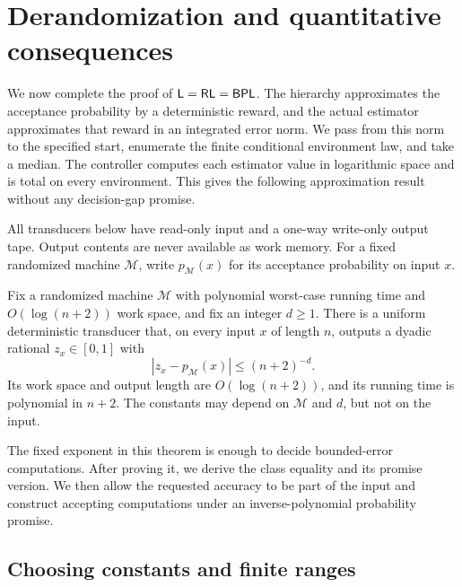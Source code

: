 \section{Derandomization and quantitative consequences}
\label{sec:conclusion}

We now complete the proof of $\mathsf L=\mathsf{RL}=\mathsf{BPL}$. The hierarchy
approximates the acceptance probability by a deterministic reward,
and the actual estimator approximates that reward in an integrated
error norm. We pass from this norm to the specified start, enumerate
the finite conditional environment law, and take a median. The
controller computes each estimator value in logarithmic space and is
total on every environment. This gives the following approximation
result without any decision-gap promise.

All transducers below have read-only input and a one-way write-only
output tape. Output contents are never available as work memory.
For a fixed randomized machine $\mathcal M$, write
$p_{\mathcal M}(x)$ for its acceptance probability on input $x$.

\begin{theorem}
\label{thm:fixed-precision}
Fix a randomized machine $\mathcal M$ with polynomial worst-case
running time and $O(\log(n+2))$ work space, and fix an integer $d\ge1$.
There is a uniform deterministic transducer that, on every input $x$
of length $n$, outputs a dyadic rational $z_x\in[0,1]$ with
\[
 |z_x-p_{\mathcal M}(x)|\le(n+2)^{-d}.
\]
Its work space and output length are $O(\log(n+2))$, and its running
time is polynomial in $n+2$. The constants may depend on
$\mathcal M$ and $d$, but not on the input.
\end{theorem}

The fixed exponent in this theorem is enough to decide bounded-error
computations. After proving it, we derive the class equality and its
promise version. We then allow the requested accuracy to be part of the
input and construct accepting computations under an inverse-polynomial
probability promise.

\subsection{Choosing constants and finite ranges}
\label{subsec:final-constants}

